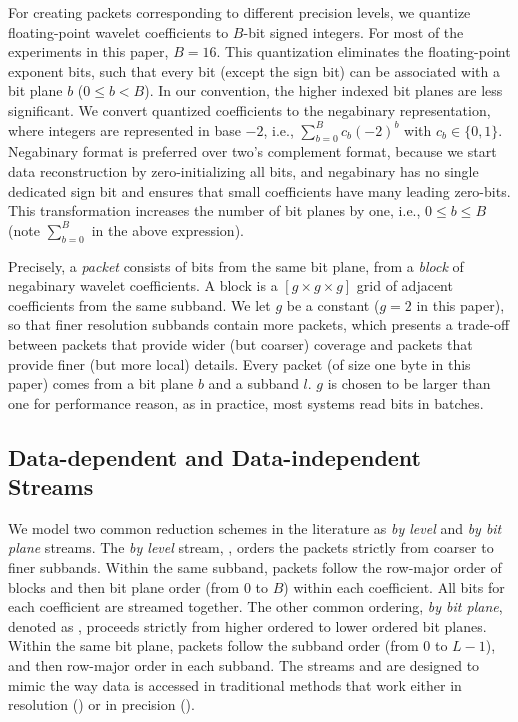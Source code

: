 For creating packets corresponding to different precision levels, we quantize floating-point wavelet
coefficients to $B$-bit signed integers. For most of the experiments in this paper, $B=16$. This
quantization eliminates the floating-point exponent bits, such that every bit (except the sign bit)
can be associated with a bit plane $b$ ($0\leq b < B$). In our convention, the higher indexed bit 
planes are less significant. We convert quantized coefficients to the negabinary representation, where integers are represented in base $-2$, i.e., $\sum_{b=0}^{B}{c_b(-2)^b}$ with $c_b\in \{0,1\}$. 
Negabinary format is preferred over two's complement format, because we start data reconstruction by 
zero-initializing all bits, and negabinary has no single dedicated sign bit and ensures that small coefficients have many leading zero-bits.
%
This transformation increases the number of bit planes by one, i.e., $0\leq b \leq B$ 
(note $\sum_{b=0}^{B}$ in the above expression).

Precisely, a \emph{packet} consists of bits from the same bit plane, from a \emph{block} of
negabinary wavelet coefficients. A block is a $[g\times g\times g]$ grid of adjacent coefficients
from the same subband. We let $g$ be a constant ($g=2$ in this paper), so that finer resolution
subbands contain more packets, which presents a trade-off between packets that provide wider (but
coarser) coverage and packets that provide finer (but more local) details. Every packet (of size one
byte in this paper) comes from a bit plane $b$ and a subband $l$. $g$ is chosen to be larger than
one for performance reason, as in practice, most systems read bits in batches.

\subsection{Data-dependent and Data-independent Streams} \label{sec:static-dynamic-streams}

We model two common reduction schemes in the literature as \emph{by level} and \emph{by bit plane}
streams. The \emph{by level} stream, \slvl, orders the packets strictly from coarser to finer
subbands. Within the same subband, packets follow the row-major order of blocks and then bit plane
order (from 0 to $B$) within each coefficient. All bits for each coefficient are streamed together.
The other common ordering, \emph{by bit plane}, denoted as \sbit, proceeds strictly from higher
ordered to lower ordered bit planes. Within the same bit plane, packets follow the subband order
(from $0$ to $L-1$), and then row-major order in each subband. The streams \slvl and \sbit are
designed to mimic the way data is accessed in traditional methods that work either in resolution
(\slvl) or in precision (\sbit).

